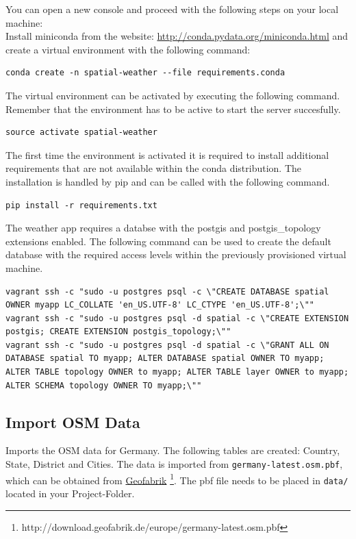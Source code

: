 \documentclass[paper=a4, fontsize=11pt]{article} %
\numberwithin{equation}{section} %
\numberwithin{figure}{section} %
\numberwithin{table}{section} %
\begin{document}
You can open a new console and proceed with the following steps on your local machine:\\
Install miniconda from the website:
\url{http://conda.pydata.org/miniconda.html} and create a virtual environment with the following command:

\begin{lstlisting}
conda create -n spatial-weather --file requirements.conda
\end{lstlisting}

The virtual environment can be activated by executing the following command.
Remember that the environment has to be active to start the server succesfully.
\begin{lstlisting}
source activate spatial-weather
\end{lstlisting}

The first time the environment is activated it is required to install additional
requirements that are not available within the conda distribution. The installation
is handled by pip and can be called with the following command.
\begin{lstlisting}
pip install -r requirements.txt
\end{lstlisting}

The weather app requires a databse with the postgis and postgis\_topology extensions enabled.
The following command can be used to create the default database with the required
access levels within the previously provisioned virtual machine.
\begin{lstlisting}[breaklines=true]
vagrant ssh -c "sudo -u postgres psql -c \"CREATE DATABASE spatial OWNER myapp LC_COLLATE 'en_US.UTF-8' LC_CTYPE 'en_US.UTF-8';\""
vagrant ssh -c "sudo -u postgres psql -d spatial -c \"CREATE EXTENSION postgis; CREATE EXTENSION postgis_topology;\""
vagrant ssh -c "sudo -u postgres psql -d spatial -c \"GRANT ALL ON DATABASE spatial TO myapp; ALTER DATABASE spatial OWNER TO myapp; ALTER TABLE topology OWNER to myapp; ALTER TABLE layer OWNER to myapp; ALTER SCHEMA topology OWNER TO myapp;\""
\end{lstlisting}

\subsection{Import OSM Data}\label{import-osm-data}

Imports the OSM data for Germany. The following tables are created: Country, State, District and Cities. The data is imported from \texttt{germany-latest.osm.pbf}, which can be obtained from \href{http://download.geofabrik.de/europe/germany-latest.osm.pbf}{Geofabrik} \footnote{http://download.geofabrik.de/europe/germany-latest.osm.pbf}. The pbf file needs to be placed in \texttt{data/} located in your Project-Folder.
\end{document}

